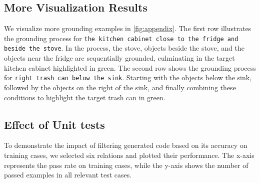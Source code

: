 \subsection{More Visualization Results}
\label{appendix:more_vis_results}

We visualize more grounding examples in \autoref{fig:appendix}.
The first row illustrates the grounding process for \texttt{the kitchen cabinet close to the fridge and beside the stove}. In the process, the stove, objects beside the stove, and the objects near the fridge are sequentially grounded, culminating in the target kitchen cabinet highlighted in green.
The second row shows the grounding process for \texttt{right trash can below the sink}. Starting with the objects below the sink, followed by the objects on the right of the sink, and finally combining these conditions to highlight the target trash can in green.


\subsection{Effect of Unit tests}

To demonstrate the impact of filtering generated code based on its accuracy on training cases, we selected six relations and plotted their performance. The x-axis represents the pass rate on training cases, while the y-axis shows the number of passed examples in all relevant test cases.

